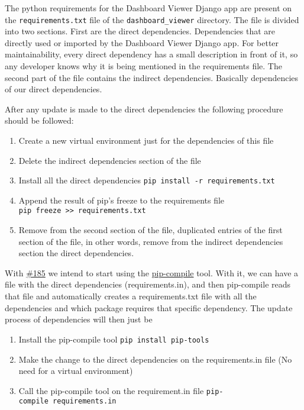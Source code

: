 \documentclass[
]{book}
\providecommand{\tightlist}{%
  \setlength{\itemsep}{0pt}\setlength{\parskip}{0pt}}
\begin{document}
The python requirements for the Dashboard Viewer Django app are present on the \texttt{requirements.txt} file of the \texttt{dashboard\_viewer} directory.
The file is divided into two sections.
First are the direct dependencies.
Dependencies that are directly used or imported by the Dashboard Viewer Django app.
For better maintainability, every direct dependency has a small description in front of it, so any developer knows why it is being mentioned in the requirements file.
The second part of the file contains the indirect dependencies.
Basically dependencies of our direct dependencies.

After any update is made to the direct dependencies the following procedure should be followed:

\begin{enumerate}
\def\labelenumi{\arabic{enumi}.}
\tightlist
\item
  Create a new virtual environment just for the dependencies of this file
\item
  Delete the indirect dependencies section of the file
\item
  Install all the direct dependencies \texttt{pip\ install\ -r\ requirements.txt}
\item
  Append the result of pip's freeze to the requirements file \texttt{pip\ freeze\ \textgreater{}\textgreater{}\ requirements.txt}
\item
  Remove from the second section of the file, duplicated entries of the first section of the file, in other words, remove from the indirect dependencies section the direct dependencies.
\end{enumerate}

With \href{https://github.com/EHDEN/NetworkDashboards/pull/185}{\#185} we intend to start using the \href{https://github.com/jazzband/pip-tools}{pip-compile} tool.
With it, we can have a file with the direct dependencies (requirements.in), and then pip-compile reads that file and automatically creates a requirements.txt file with all the dependencies and which package requires that specific dependency.
The update process of dependencies will then just be

\begin{enumerate}
\def\labelenumi{\arabic{enumi}.}
\tightlist
\item
  Install the pip-compile tool \texttt{pip\ install\ pip-tools}
\item
  Make the change to the direct dependencies on the requirements.in file (No need for a virtual environment)
\item
  Call the pip-compile tool on the requirement.in file \texttt{pip-compile\ requirements.in}
\end{enumerate}
\end{document}
